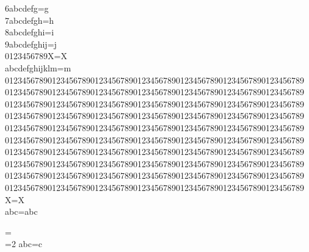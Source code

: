 \Test6abcdefg=g\\
\Test7abcdefgh=h\\
\Test8abcdefghi=i\\
\Test9abcdefghij=j\\
0123456789X=X\\
abcdefghijklm=m\\
%
0123456789012345678901234567890123456789012345678901234567890123456789%
0123456789012345678901234567890123456789012345678901234567890123456789%
0123456789012345678901234567890123456789012345678901234567890123456789%
0123456789012345678901234567890123456789012345678901234567890123456789%
0123456789012345678901234567890123456789012345678901234567890123456789%
0123456789012345678901234567890123456789012345678901234567890123456789%
0123456789012345678901234567890123456789012345678901234567890123456789%
0123456789012345678901234567890123456789012345678901234567890123456789%
0123456789012345678901234567890123456789012345678901234567890123456789%
0123456789012345678901234567890123456789012345678901234567890123456789%
X=X\\
abc=abc\\
\par\par\relax=\relax\\

\begingroup
  =2 %
  abc=c\\%
\endgroup



